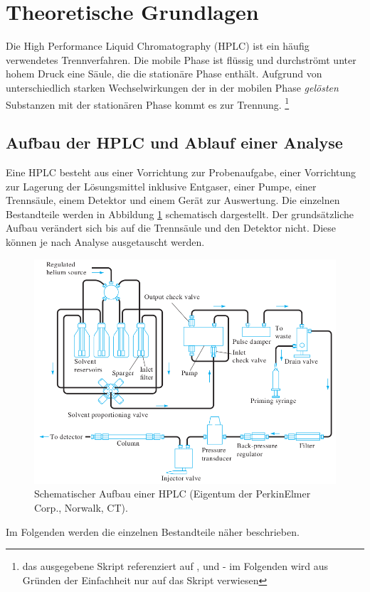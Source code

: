 \section{Theoretische Grundlagen}
  
  Die High Performance Liquid Chromatography (HPLC) ist ein häufig verwendetes Trennverfahren. Die mobile Phase ist flüssig und durchströmt unter hohem Druck eine Säule, die die stationäre Phase enthält. Aufgrund von unterschiedlich starken Wechselwirkungen der in der mobilen Phase \textit{gelösten} Substanzen mit der stationären Phase kommt es zur Trennung. \citep{SkriptHPLC}\footnote{das ausgegebene Skript referenziert auf \citep{QuantitativeAnalyseHarris}, \citep{InstrumentelleAnalytikSkoog} und \citep{ModernLiquidChromatography} - im Folgenden wird aus Gründen der Einfachheit nur auf das Skript verwiesen}
  
  \subsection{Aufbau der HPLC und Ablauf einer Analyse}
    
    Eine HPLC besteht aus einer Vorrichtung zur Probenaufgabe, einer Vorrichtung zur Lagerung der Lösungsmittel inklusive Entgaser, einer Pumpe, einer Trennsäule, einem Detektor und einem Gerät zur Auswertung. Die einzelnen Bestandteile werden in Abbildung \ref{fig:AufbauHPLC} schematisch dargestellt. Der grundsätzliche Aufbau verändert sich bis auf die Trennsäule und den Detektor nicht. Diese können je nach Analyse ausgetauscht werden. 
    
      \begin{figure}[H]
        \includegraphics[scale=0.3, center]{images/PartsOfHPLC.png} 
        \caption[Schematischer Aufbau einer HPLC (Eigentum der PerkinElmer Corp., Norwalk, CT), Quelle: \citep{InstrumentelleAnalytikSkoog}]{Schematischer Aufbau einer HPLC (Eigentum der PerkinElmer Corp., Norwalk, CT).}
        \label{fig:AufbauHPLC}
      \end{figure}
    Im Folgenden werden die einzelnen Bestandteile näher beschrieben.
      
